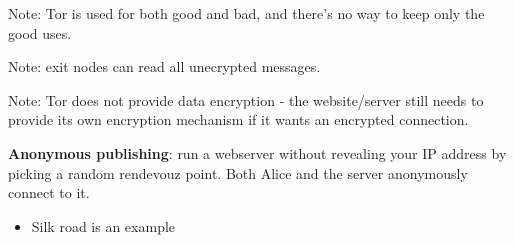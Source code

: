 Note: Tor is used for both good and bad, and there's no way to keep only the good uses.

Note: exit nodes can read all unecrypted messages.

Note: Tor does not provide data encryption - the website/server still needs to provide its own encryption mechanism if it wants an encrypted connection.

{\bf Anonymous publishing}: run a webserver without revealing your IP address by picking a random rendevouz point. Both Alice and the server anonymously connect to it.
\begin{itemize}
     \item Silk road is an example
\end{itemize}


